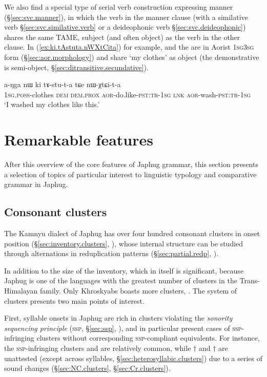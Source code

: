 We also find a special type of serial verb construction expressing manner (§\ref{sec:svc.manner}), in which the verb in the manner clause (with a similative verb §\ref{sec:svc.similative.verb} or a deideophonic verb §\ref{sec:svc.deideophonic}) shares the same TAME, subject (and often object) as the verb in the other clause.  In (\ref{ex:ki.tAstuta.nWXtCita}) for example,   and the  are in Aorist \textsc{1sg}\fl{}\textsc{3sg} form (§\ref{sec:aor.morphology}) and share  `my clothes' as object (the demonstrative  is semi-object, §\ref{sec:ditransitive.secundative}).
 

\begin{exe} 
\ex \label{ex:ki.tAstuta.nWXtCita}
\gll a-ŋga nɯ ki tɤ-stu-t-a tɕe nɯ-χtɕi-t-a \\
\textsc{1sg}.\textsc{poss}-clothes \textsc{dem} \textsc{dem}.\textsc{prox} \textsc{aor}-do.like-\textsc{pst}:\textsc{tr}-\textsc{1sg} \textsc{lnk}   \textsc{aor}-wash-\textsc{pst}:\textsc{tr}-\textsc{1sg} \\
\glt `I washed my clothes like this.' 
\end{exe} 

\section{Remarkable features} \label{sec:remarkable.features}
After this overview of the core features of Japhug grammar, this section presents a selection of topics of particular interest to linguistic typology and comparative grammar in Japhug.

\subsection{Consonant clusters}
The Kamnyu dialect of Japhug has over four hundred consonant clusters in onset position (§\ref{sec:inventory.clusters}, \citealt{jacques19ipa}), whose internal structure can be studied through alternations in reduplication patterns (§\ref{sec:partial.redp}, \citealt{jacques07redupl}).
 
 In addition to the size of the inventory, which in itself is significant, because Japhug is one of the languages with the greatest number of clusters in the Trans-Himalayan family. Only Khroskyabs boasts more clusters, \citep[101]{lai17khroskyabs}. The system of clusters presents two main points of interest.
 
 First,  syllable onsets in Japhug are rich in clusters violating the  \textit{sonority sequencing principle} (\textsc{ssp}, §\ref{sec:ssp}, \citealt[210]{blevins95syllable}), and in particular present cases of \textsc{ssp}-infringing clusters without corresponding \textsc{ssp}-compliant equivalents. For instance, the \textsc{ssp}-infringing clusters   and  are relatively common, while $\dagger$ and $\dagger$ are unattested (except across syllables, §\ref{sec:heterosyllabic.clusters}) due to a series of sound changes  (§\ref{sec:NC.clusters}, §\ref{sec:Cr.clusters}).
 
